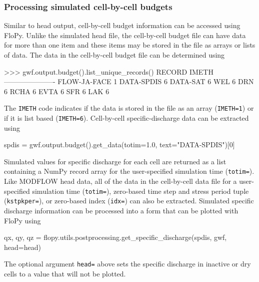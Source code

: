 \documentclass[12pt, oneside]{article}  	%
\begin{document}
\subsubsection*{Processing simulated cell-by-cell budgets}

Similar to head output, cell-by-cell budget information can be accessed using FloPy. Unlike the simulated head file, the cell-by-cell budget file can have data for more than one item and these items may be stored in the file as arrays or lists of data. The data in the cell-by-cell budget file can be determined using

\begin{python}
>>> gwf.output.budget().list_unique_records()
RECORD           IMETH
----------------------
FLOW-JA-FACE         1
DATA-SPDIS           6
DATA-SAT             6
WEL                  6
DRN                  6
RCHA                 6
EVTA                 6
SFR                  6
LAK                  6
\end{python}

\noindent The \texttt{IMETH} code indicates if the data is stored in the file as an array (\texttt{IMETH=1}) or if it is list based (\texttt{IMETH=6}). Cell-by-cell specific-discharge data can be extracted using

\begin{python}
spdis = gwf.output.budget().get_data(totim=1.0, text="DATA-SPDIS")[0]
\end{python}

\noindent Simulated values for specific discharge for each cell are returned as a list containing a NumPy record array for the user-specified simulation time (\texttt{totim=}). Like MODFLOW head data, all of the data in the cell-by-cell data file for a user-specified simulation time (\texttt{totim=}), zero-based time step and stress period tuple (\texttt{kstpkper=}), or zero-based index (\texttt{idx=}) can also be extracted. Simulated specific discharge information can be processed into a form that can be plotted with FloPy using 

\begin{python}
qx, qy, qz = flopy.utils.postprocessing.get_specific_discharge(spdis, gwf, 
                                                               head=head)
\end{python}

\noindent The optional argument \texttt{head=} above sets the specific discharge in inactive or dry cells to a value that will not be plotted. 
\end{document}
